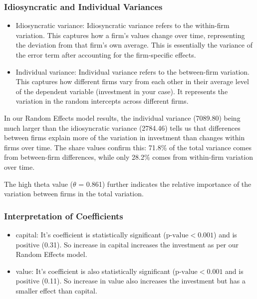 \documentclass[a4paper]{article}
\begin{document}

\subsubsection*{\textbf{Idiosyncratic and Individual Variances}}
\begin{itemize}
    \item Idiosyncratic variance: Idiosyncratic variance refers to the within-firm variation. This captures how a firm's values change over time, representing the deviation from that firm's own average. This is essentially the variance of the error term after accounting for the firm-specific effects.
    \item Individual variance: Individual variance refers to the between-firm variation. This captures how different firms vary from each other in their average level of the dependent variable (investment in your case). It represents the variation in the random intercepts across different firms.
\end{itemize}

In our Random Effects model results, the individual variance (7089.80) being much larger than the idiosyncratic variance (2784.46) tells us that differences between firms explain more of the variation in investment than changes within firms over time. The share values confirm this: 71.8\% of the total variance comes from between-firm differences, while only 28.2\% comes from within-firm variation over time.

The high theta value (\(\theta\) = 0.861) further indicates the relative importance of the variation between firms in the total variation. 

\subsubsection*{\textbf{Interpretation of Coefficients}}
\begin{itemize}
    \item capital: It's coefficient is statistically significant (\(\text{p-value}<0.001\)) and is positive (0.31). So increase in capital increases the investment as per our Random Effects model.
    \item value: It's coefficient is also statistically significant (\(\text{p-value}<0.001\) and is positive (0.11). So increase in value also increases the investment but has a smaller effect than capital.
\end{itemize}

\end{document}
